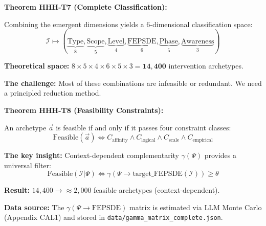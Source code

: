 \begin{tcolorbox}[colback=orange!5!white, colframe=orange!75!black,
    title=\textbf{The 14,400 Archetype Space}]

\textbf{Theorem HHH-T7 (Complete Classification):}

Combining the emergent dimensions yields a 6-dimensional classification space:
\begin{equation}
\mathcal{I} \mapsto (\underbrace{\text{Type}}_{8}, \underbrace{\text{Scope}}_{5}, \underbrace{\text{Level}}_{4}, \underbrace{\text{FEPSDE}}_{6}, \underbrace{\text{Phase}}_{5}, \underbrace{\text{Awareness}}_{3})
\end{equation}

\textbf{Theoretical space:} $8 \times 5 \times 4 \times 6 \times 5 \times 3 = \mathbf{14{,}400}$ intervention archetypes.

\textbf{The challenge:} Most of these combinations are infeasible or redundant. We need a principled reduction method.

\end{tcolorbox}

\begin{tcolorbox}[colback=green!5!white, colframe=green!75!black,
    title=\textbf{The Elegant Reduction: $\gamma(\Psi)$ Feasibility Filter}]

\textbf{Theorem HHH-T8 (Feasibility Constraints):}

An archetype $\vec{a}$ is feasible if and only if it passes four constraint classes:
\begin{equation}
\text{Feasible}(\vec{a}) \iff C_{\text{affinity}} \wedge C_{\text{logical}} \wedge C_{\text{scale}} \wedge C_{\text{empirical}}
\end{equation}

\textbf{The key insight:} Context-dependent complementarity $\gamma(\Psi)$ provides a universal filter:
\begin{equation}
\boxed{\text{Feasible}(\mathcal{I} | \Psi) \iff \gamma(\Psi \rightarrow \text{target\_FEPSDE}(\mathcal{I})) \geq \theta}
\end{equation}

\textbf{Result:} $14{,}400 \rightarrow \approx 2{,}000$ feasible archetypes (context-dependent).

\textbf{Data source:} The $\gamma(\Psi \rightarrow \text{FEPSDE})$ matrix is estimated via LLM Monte Carlo (Appendix CAL1) and stored in \texttt{data/gamma\_matrix\_complete.json}.

\end{tcolorbox}


